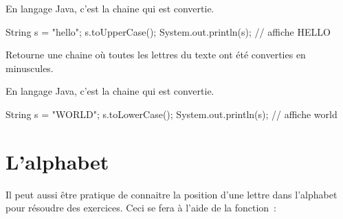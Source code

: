 \begin{description}
		En langage Java, c'est la chaine qui est convertie. \\

		\begin{java}
String s = "hello";
s.toUpperCase();
System.out.println(s);		// affiche HELLO
		\end{java}

	\item[\pc{toLowerCase(s: string)\Gives~string}]
		Retourne une chaine où toutes les lettres du texte
		ont été converties en minuscules.
		
		En langage Java, c'est la chaine qui est convertie. \\

		\begin{java}
String s = "WORLD";
s.toLowerCase();
System.out.println(s);		// affiche world
		\end{java}
	
	\end{description}
	

\section{L’alphabet}

	Il peut aussi être pratique de connaitre la position d’une lettre dans
	l’alphabet pour résoudre des exercices.  Ceci se fera à l’aide de la
	fonction~:

